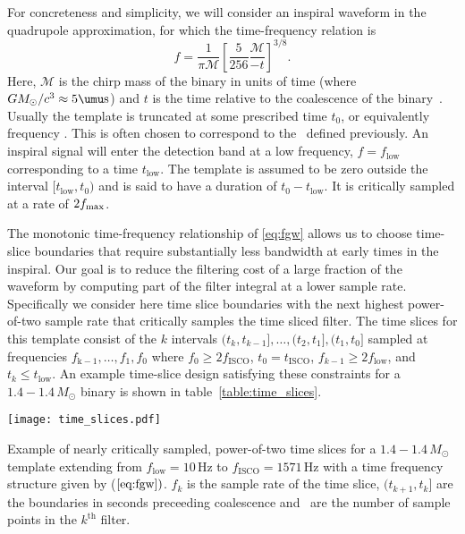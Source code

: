 For concreteness and simplicity, we will consider an inspiral waveform in the
quadrupole approximation, for which the time-frequency relation is
%
\begin{equation} \label{eq:fgw}
%
f = \frac{1}{\mathcal{\pi M}} \left[ \frac{5}{256}\frac{\mathcal{M}}{-t}
\right]^{3/8}.
%
\end{equation}
%
Here, $\mathcal{M}$ is the chirp mass of the binary in units of time (where $G
M_\odot / c^3 \approx 5 \umu\mathrm{s}$) and $t$ is the time relative to the
coalescence of the binary~\cite{findchirppaper, kidder1992}.  Usually the
template is truncated at some prescribed time $t_0$, or equivalently frequency \fmax.
This is often chosen to correspond to the \ISCO\ defined previously. An inspiral signal
will enter the detection band at a low frequency, $f = f_\mathrm{low}$
corresponding to a time $t_\mathrm{low}$.  The template is assumed to be zero
outside the interval $[t_\mathrm{low}, t_\mathrm{0})$ and is said to have  a
duration of $t_\mathrm{0} - t_\mathrm{low}$. It is critically sampled at a
rate of $2 f_{\mathrm{max}}$.

The monotonic time-frequency relationship of \eqref{eq:fgw} allows us to choose
time-slice boundaries that require substantially less bandwidth at early times
in the inspiral.  Our goal is to reduce the filtering cost of a large fraction
of the waveform by computing part of the filter integral at a lower sample
rate.  Specifically we consider here time slice boundaries with the next
highest power-of-two sample rate that critically samples the time sliced
filter.  The time slices for this template consist of the $k$ intervals $(t_k,
t_{k-1}], \dots, (t_2, t_1], (t_1, t_0]$ sampled at frequencies
$f_\mathrm{k-1}, \dots, f_1, f_0$ where $f_0 \geq 2 f_\mathrm{ISCO}$, $t_0 =
t_\mathrm{ISCO}$, $f_{k-1} \geqslant 2 f_\mathrm{low}$, and $t_k \leqslant
t_\mathrm{low}$. An example time-slice design satisfying these constraints for
a $1.4 - 1.4 \, M_{\odot}$ binary is shown in table~\ref{table:time_slices}.
%
\begin{table}[h!]
\begin{minipage}[c]{0.52\textwidth}
\centering
\vspace{0.8cm}
\texttt{[image: time\_slices.pdf]}
\end{minipage}
\begin{minipage}[c]{0.3\textwidth}
\centering

\end{minipage}
\caption{\label{table:time_slices} Example of nearly critically sampled,
power-of-two time slices for a $1.4 - 1.4 \, M_{\odot}$ template extending from
$f_\mathrm{low} = 10 \, \mathrm{Hz}$ to $f_\mathrm{ISCO} = 1571\, \mathrm{Hz}$
with a time frequency structure given by ($\ref{eq:fgw})$. $f_k$ is the sample
rate of the time slice, $(t_{k+1}, t_k]$ are the boundaries in seconds
preceeding coalescence and \slicessamps\ are the number of sample points in the
$k^{\mathrm{th}}$ filter.}
\end{table}
%

